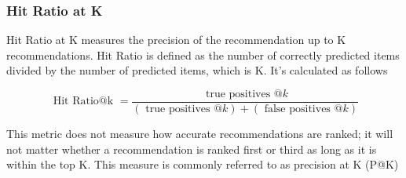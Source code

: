 \documentclass{tex_files/kththesis}
\begin{document}
\subsubsection{Hit Ratio at K}
Hit Ratio at K measures the precision of the recommendation up to K recommendations. Hit Ratio is defined as the
number of correctly predicted items divided by the number of predicted
items, which is K. It's calculated as follows

\begin{equation}
\text { Hit Ratio@k }=\frac{\text { true positives } @ k}{(\text { true positives } @ k)+(\text { false positives } @ k)}
\end{equation}

This metric does not measure how accurate recommendations are ranked; it will not matter whether a recommendation is ranked first or third as long as it is within the top K. This measure is commonly referred to as precision at K (P@K)



\end{document}
